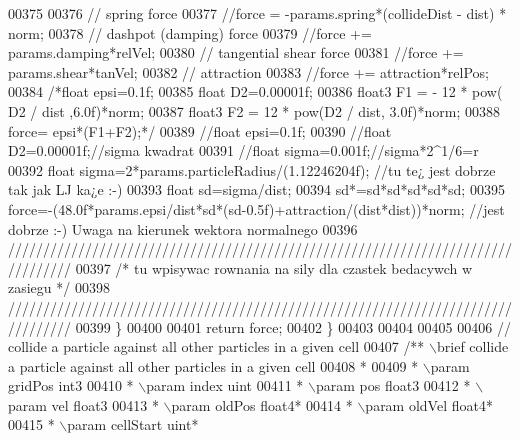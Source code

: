 \begin{DoxyCode}
00375 
00376         \textcolor{comment}{// spring force}
00377         \textcolor{comment}{//force = -params.spring*(collideDist - dist) * norm;}
00378         \textcolor{comment}{// dashpot (damping) force}
00379         \textcolor{comment}{//force += params.damping*relVel;}
00380         \textcolor{comment}{// tangential shear force}
00381         \textcolor{comment}{//force += params.shear*tanVel;}
00382         \textcolor{comment}{// attraction}
00383         \textcolor{comment}{//force += attraction*relPos;}
00384                 \textcolor{comment}{/*float epsi=0.1f;}
00385 \textcolor{comment}{                float D2=0.00001f;}
00386 \textcolor{comment}{                float3 F1 = - 12 * pow( D2 /  dist ,6.0f)*norm;}
00387 \textcolor{comment}{                float3 F2 = 12 * pow(D2 / dist, 3.0f)*norm;}
00388 \textcolor{comment}{                force= epsi*(F1+F2);*/}
00389                 \textcolor{comment}{//float epsi=0.1f;}
00390                 \textcolor{comment}{//float D2=0.00001f;//sigma kwadrat}
00391                 \textcolor{comment}{//float sigma=0.001f;//sigma*2^1/6=r}
00392                 \textcolor{keywordtype}{float} sigma=2*params.particleRadius/(1.12246204f); \textcolor{comment}{//tu te¿ jest dobrze tak jak LJ
       ka¿e :-)}
00393                 \textcolor{keywordtype}{float} sd=sigma/dist;
00394                 sd*=sd*sd*sd*sd*sd;
00395                 force=-(48.0f*params.epsi/dist*sd*(sd-0.5f)+attraction/(dist*dist))*norm; \textcolor{comment}{//jest
       dobrze :-) Uwaga na kierunek wektora normalnego}
00396 \textcolor{comment}{/////////////////////////////////////////////////////////////////////////////////}
00397 \textcolor{comment}{/*      tu wpisywac rownania na sily dla czastek bedacywch w zasiegu    */}
00398 \textcolor{comment}{/////////////////////////////////////////////////////////////////////////////////}
00399     \}
00400 
00401     \textcolor{keywordflow}{return} force;
00402 \}
00403 
00404 
00405 
00406 \textcolor{comment}{// collide a particle against all other particles in a given cell}
00407 \textcolor{comment}{/** \(\backslash\)brief collide a particle against all other particles in a given cell}
00408 \textcolor{comment}{ *}
00409 \textcolor{comment}{ * \(\backslash\)param gridPos int3}
00410 \textcolor{comment}{ * \(\backslash\)param index uint}
00411 \textcolor{comment}{ * \(\backslash\)param pos float3}
00412 \textcolor{comment}{ * \(\backslash\)param vel float3}
00413 \textcolor{comment}{ * \(\backslash\)param oldPos float4*}
00414 \textcolor{comment}{ * \(\backslash\)param oldVel float4*}
00415 \textcolor{comment}{ * \(\backslash\)param cellStart uint*}

\end{DoxyCode}
